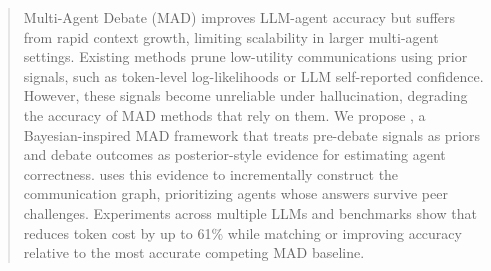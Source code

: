 \begin{abstract}
Multi-Agent Debate (MAD) improves LLM-agent accuracy but suffers from rapid context growth, limiting scalability in larger multi-agent settings. Existing methods prune low-utility communications using prior signals, such as token-level log-likelihoods or LLM self-reported confidence. However, these signals become unreliable under hallucination, degrading the accuracy of MAD methods that rely on them. We propose \sysname, a Bayesian-inspired MAD framework that treats pre-debate signals as priors and debate outcomes as posterior-style evidence for estimating agent correctness. \sysname uses this evidence to incrementally construct the communication graph, prioritizing agents whose answers survive peer challenges. Experiments across multiple LLMs and benchmarks show that \sysname reduces token cost by up to 61\% while matching or improving accuracy relative to the most accurate competing MAD baseline.
\end{abstract}